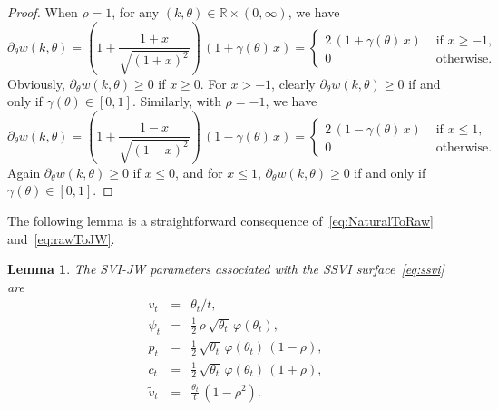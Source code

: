 \documentclass[12pt]{article}
\newtheorem{lemma}{Lemma}[section]
\numberwithin{equation}{section}
\newcommand{\R}{\mathbb{R}}
\newcommand{\p}{\partial}
\newcommand{\beas}{\begin{eqnarray*}}
\newcommand{\eeas}{\end{eqnarray*}}
\begin{document}
\begin{proof}
When $\rho=1$, for any $(k,\theta)\in\R\times (0,\infty)$, we have
$$
\p_\theta w(k,\theta) = \left( 1+\frac{1+x}{\sqrt{(1+x)^2}} \right)\,\left(1 + \gamma(\theta)\,x\right)
= \left\{\begin{array}{ll}
2\,(1 + \gamma(\theta)\,x) &\text{ if } x \geq -1,\\
0 & \text{ otherwise}.
\end{array}
\right.
$$
Obviously, $\p_\theta w(k,\theta) \geq 0$ if $x \geq 0$.  
For $x>-1$,
clearly $\p_\theta w(k,\theta) \geq 0$ if and only if $\gamma(\theta)\in [0,1]$.
Similarly, with $\rho=-1$, we have
$$
\p_\theta w(k,\theta) = \left( 1+\frac{1-x}{\sqrt{(1-x)^2}} \right)\,\left(1 - \gamma(\theta)\,x\right)
 = \left\{\begin{array}{ll}
2\,(1 - \gamma(\theta)\,x) &\text{ if } x \leq 1,\\
0 & \text{ otherwise}.
\end{array}
\right.
$$
Again $\p_\theta w(k,\theta) \geq 0$ if $x \leq 0$, and for $x\leq 1$,
$\p_\theta w(k,\theta) \geq 0$
if and only if 
$\gamma(\theta)\in [0,1]$.
\end{proof}







The following lemma is a straightforward consequence of~\eqref{eq:NaturalToRaw} and~\eqref{eq:rawToJW}.
\begin{lemma}\label{lem:ssviToJW}
The SVI-JW parameters associated with the SSVI surface~\eqref{eq:ssvi} are
\beas
v_t&=&\theta_t/t,\\
\psi_t&=&\frac{1}{2}\,\rho\,\sqrt{\theta_t}\,\varphi(\theta_t),\\
p_t&=&\frac12\,\sqrt{\theta_t}\,\varphi(\theta_t)\,(1-\rho),\\
c_t&=&\frac 12\,\sqrt{\theta_t}\,\varphi(\theta_t)\,(1+\rho),\\
\widetilde v_t&=&\frac{\theta_t}{t}\,(1-\rho^2).
\eeas
\end{lemma}
\end{document}
